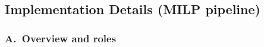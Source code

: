 

\subsection{Implementation Details (MILP pipeline)}
\label{ssec:milp_impl}
%

\subsubsection*{A.\ Overview and roles}

